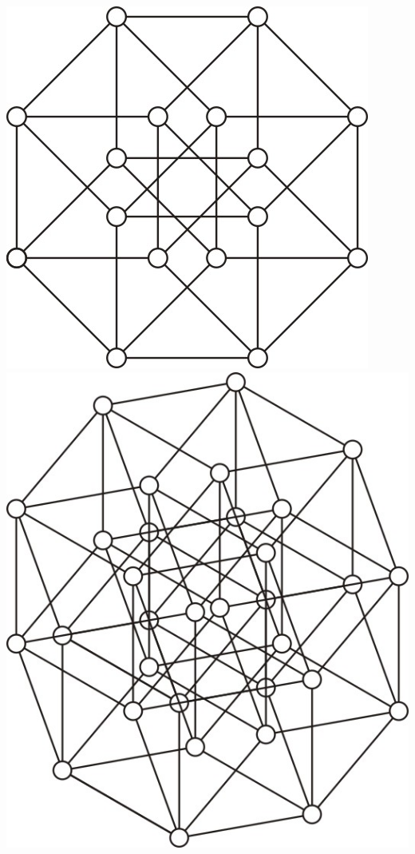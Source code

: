 \documentclass{pracamgr}
\begin{document}
   \includegraphics[scale=1]{img/unitary_4.jpg}
   \includegraphics[scale=1]{img/unitary_5_1.jpg}
   
\end{document}
